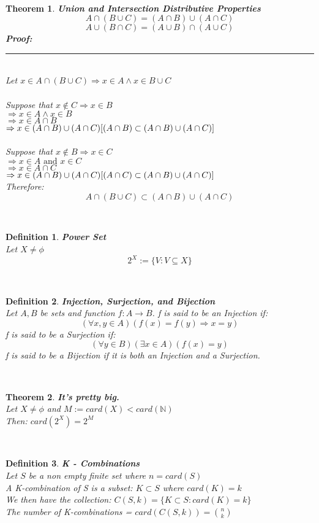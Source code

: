 \documentclass[12pt]{extarticle}
\theoremstyle{plain}
\newtheorem{thm}{Theorem}[section]
\theoremstyle{plain}
\theoremstyle{plain}
\theoremstyle{Definition}
\newtheorem{def.}{Definition}[section]
\theoremstyle{Definition}
\theoremstyle{plain}
\newcommand{\cut}[0]{\noindent\framebox[\linewidth]{\rule{\linewidth}{2pt}}\\}
\newcommand{\prof}[0]{	\noindent \textbf{Proof:} \rule{500pt}{2pt} \\ }
\begin{document}
\cut
\begin{thm} \textbf{Union and Intersection Distributive Properties} \\ 
	$$A \cap (B \cup C) = (A \cap B) \cup (A \cap C)$$ 	
	$$A \cup (B \cap C) = (A \cup B) \cap (A \cup C)$$
	\prof
	Let $x \in A \cap (B \cup C) \Rightarrow x \in A \land x \in B \cup C$ \\ \\
	Suppose that $x \not \in C \Rightarrow x \in B$ \\ 
	$\Rightarrow x \in A \land x \in B$ \\ 
	$\Rightarrow x \in A \cap B$ \\ 
	$\Rightarrow x \in (A \cap B) \cup (A \cap C) \hfill [(A \cap B) \subset (A \cap B) \cup (A \cap C)]$ \\ \\
	Suppose that $x \not \in B \Rightarrow x \in C$ \\ 
	$\Rightarrow x \in A \text{ and } x \in C$ \\ 
	$\Rightarrow x \in A \cap C$ \\ 
	$\Rightarrow x \in (A \cap B) \cup (A \cap C) \hfill [(A \cap C) \subset (A \cap B) \cup (A \cap C)]$ \\
	Therefore: \\ 
	$$A \cap (B \cup C) \subset (A \cap B) \cup (A \cap C)$$ 	
\end{thm}
\cut
\begin{def.} \textbf{Power Set} \\ 
	Let $X \not = \phi$ \\ 
	$$2^X := \{V : V \subseteq X\}$$
\end{def.}
\cut
\begin{def.} \textbf{Injection, Surjection, and Bijection} \\
	Let $A,B$ be sets and  function $f : A \to B$.
	f is said to be an Injection if: \\ 
	$$(\forall x,y \in A)(f(x) = f(y) \Rightarrow x = y)$$
	f is said to be a Surjection if: \\ 
	$$(\forall y \in B)(\exists x \in A)(f(x) = y)$$
	f is said to be a Bijection if it is both an Injection and a Surjection.  
\end{def.}
\cut
\begin{thm} \textbf{It's pretty big.} \\ 
	Let $X \not = \phi$ and $M := card(X) < card(\mathbb{N})$ \\
	Then: $card(2^X) = 2^M$ 
\end{thm}
\cut
\begin{def.} \textbf{K - Combinations} \\
	Let $S$ be a non empty finite set where $n = card(S)$ \\ 
	A K-combination of S is a subset: $K \subset S$ where $card(K) = k$ \\ 
	We then have the collection: $C(S,k) = \{K \subset S : card(K) = k\}$ \\
	The number of K-combinations = $card(C(S,k)) = \binom{n}{k}$
\end{def.}
\end{document}
